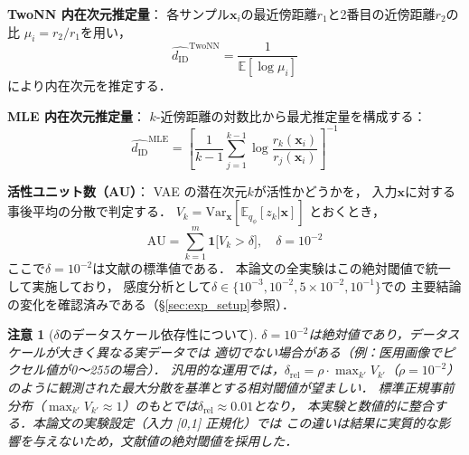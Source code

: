 \documentclass[12pt,a4paper]{jsarticle}
\newtheorem{remark}{注意}
\newcommand{\dID}{d_{\mathrm{ID}}}
\newcommand{\dz}{m}                         %
\begin{document}
\textbf{TwoNN 内在次元推定量}\cite{facco2017twonn}：
各サンプル$\boldsymbol{x}_i$の最近傍距離$r_1$と2番目の近傍距離$r_2$の比
$\mu_i = r_2/r_1$を用い，
\begin{equation}
  \hat{\dID}^{\mathrm{TwoNN}} = \frac{1}{\mathbb{E}[\log \mu_i]}
\end{equation}
により内在次元を推定する．

\textbf{MLE 内在次元推定量}\cite{levina2005mle}：
$k$-近傍距離の対数比から最尤推定量を構成する：
\begin{equation}
  \hat{\dID}^{\mathrm{MLE}} = \left[
    \frac{1}{k-1}\sum_{j=1}^{k-1}\log\frac{r_k(\boldsymbol{x}_i)}{r_j(\boldsymbol{x}_i)}
  \right]^{-1}
\end{equation}

\textbf{活性ユニット数（AU）}\cite{lucas2019elbo}：
VAE の潜在次元$k$が活性かどうかを，
入力$\boldsymbol{x}$に対する事後平均の分散で判定する．
$V_k = \mathrm{Var}_{\boldsymbol{x}}[\mathbb{E}_{q_\phi}[z_k|\boldsymbol{x}]]$
とおくとき，
\begin{equation}
  \mathrm{AU} = \sum_{k=1}^{\dz}
  \mathbf{1}\bigl[V_k > \delta\bigr],
  \quad \delta = 10^{-2}
  \label{eq:au}
\end{equation}
ここで$\delta = 10^{-2}$は文献\cite{lucas2019elbo}の標準値である．
本論文の全実験はこの絶対閾値で統一して実施しており，
感度分析として$\delta \in \{10^{-3}, 10^{-2}, 5\times10^{-2}, 10^{-1}\}$での
主要結論の変化を確認済みである（§\ref{sec:exp_setup}参照）．

\begin{remark}[$\delta$のデータスケール依存性について]
$\delta = 10^{-2}$は絶対値であり，データスケールが大きく異なる実データでは
適切でない場合がある（例：医用画像でピクセル値が0〜255の場合）．
汎用的な運用では，$\delta_\mathrm{rel} = \rho \cdot \max_{k'} V_{k'}$（$\rho = 10^{-2}$）
のように観測された最大分散を基準とする相対閾値が望ましい．
標準正規事前分布（$\max_{k'} V_{k'} \approx 1$）のもとでは$\delta_\mathrm{rel} \approx 0.01$となり，
本実験と数値的に整合する．本論文の実験設定（入力 [0,1] 正規化）では
この違いは結果に実質的な影響を与えないため，文献値の絶対閾値を採用した．
\end{remark}
\end{document}
